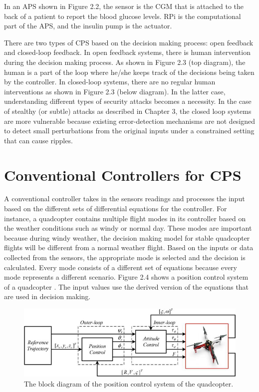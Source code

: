 In an \ac{APS} shown in Figure 2.2, the sensor is the \ac{CGM} that is attached to the back of a patient to report the blood glucose levels.  
\ac{RPi} is the computational part of the \ac{APS}, and the insulin pump is the actuator. 

There are two types of CPS based on the decision making process: open feedback and closed-loop feedback.
In open feedback systems, there is human intervention during the decision making process. 
As shown in Figure 2.3 (top diagram), the human is a part of the loop where he/she keeps track of the decisions being taken by the controller. 
In closed-loop systems, there are no regular human interventions  
as shown in Figure 2.3 (below diagram). 
In the latter case, understanding different types of security attacks becomes a necessity. 
In the case of stealthy (or subtle) attacks as described in Chapter 3, 
the closed loop systems are more vulnerable because existing error-detection mechanisms are not designed to detect small perturbations from the original 
inputs under a constrained setting that can cause ripples. 

\section{Conventional Controllers for CPS}

A conventional controller takes in the sensors readings and processes the input based on the different sets of differential equations for the controller. 
For instance, a quadcopter contains multiple flight modes in its controller based on the weather conditions such as windy or normal day. 
These modes are important because during windy weather, the decision making model for stable quadcopter flights will be different from a normal weather flight. 
Based on the inputs or data collected from the sensors, the appropriate  mode is selected and the decision is calculated. 
Every mode consists of a different set of equations because every mode represents a different scenario.
Figure 2.4 shows a position control system of a quadcopter \cite{inbook}. The input values use the derived version of the equations that are used in decision making. 

\begin{figure}
	\centering
	\includegraphics[width=0.7\linewidth]{Images/controltheory}
	\caption{The block diagram of the position control system of the quadcopter.
	}
	\label{fig:controltheory}
\end{figure}


